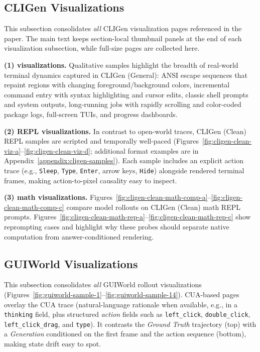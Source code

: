 \subsection{CLIGen Visualizations}
\noindent This subsection consolidates \emph{all} CLIGen visualization pages referenced in the paper.
The main text keeps section-local thumbnail panels at the end of each visualization subsection, while full-size pages are collected here.

\noindent\textbf{(1) \cligenGeneralData{} visualizations.}
Qualitative samples highlight the breadth of real-world terminal dynamics captured in CLIGen (General): ANSI escape sequences that repaint regions with changing foreground/background colors, incremental command entry with syntax highlighting and cursor edits, classic shell prompts and system outputs, long-running jobs with rapidly scrolling and color-coded package logs, full-screen TUIs, and progress dashboards.

\noindent\textbf{(2) \cligenCleanData{} REPL visualizations.}
In contrast to open-world traces, CLIGen (Clean) REPL samples are scripted and temporally well-paced (Figures~\ref{fig:cligen-clean-viz-a}--\ref{fig:cligen-clean-viz-d}; additional format examples are in Appendix~\ref{appendix:cligen-samples}). Each sample includes an explicit action trace (e.g., \texttt{Sleep}, \texttt{Type}, \texttt{Enter}, arrow keys, \texttt{Hide}) alongside rendered terminal frames, making action-to-pixel causality easy to inspect.

\noindent\textbf{(3) \cligenCleanData{} math visualizations.}
Figures~\ref{fig:cligen-clean-math-comp-a}--\ref{fig:cligen-clean-math-comp-c} compare model rollouts on CLIGen (Clean) math REPL prompts. Figures~\ref{fig:cligen-clean-math-rep-a}--\ref{fig:cligen-clean-math-rep-c} show reprompting cases and highlight why these probes should separate native computation from answer-conditioned rendering.

\subsection{GUIWorld Visualizations}
\noindent This subsection consolidates \emph{all} GUIWorld rollout visualizations (Figures~\ref{fig:guiworld-sample-1}--\ref{fig:guiworld-sample-14}).
CUA-based pages overlay the CUA trace (natural-language rationale when available, e.g., in a \texttt{thinking} field, plus structured \emph{action} fields such as \texttt{left\_click}, \texttt{double\_click}, \texttt{left\_click\_drag}, and \texttt{type}).
It contrasts the \emph{Ground Truth} trajectory (top) with a \emph{Generation} conditioned on the first frame and the action sequence (bottom), making state drift easy to spot.

